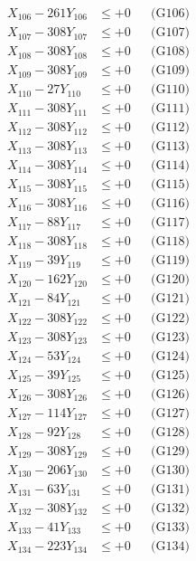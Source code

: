 \documentclass[a4paper,10pt]{article}
\begin{document}
{\begin{align}
X_{106} - 261Y_{106} &\leq +0 && \text{(G106)} \\
X_{107} - 308Y_{107} &\leq +0 && \text{(G107)} \\
X_{108} - 308Y_{108} &\leq +0 && \text{(G108)} \\
X_{109} - 308Y_{109} &\leq +0 && \text{(G109)} \\
X_{110} - 27Y_{110} &\leq +0 && \text{(G110)} \\
\allowbreak
X_{111} - 308Y_{111} &\leq +0 && \text{(G111)} \\
X_{112} - 308Y_{112} &\leq +0 && \text{(G112)} \\
X_{113} - 308Y_{113} &\leq +0 && \text{(G113)} \\
X_{114} - 308Y_{114} &\leq +0 && \text{(G114)} \\
X_{115} - 308Y_{115} &\leq +0 && \text{(G115)} \\
X_{116} - 308Y_{116} &\leq +0 && \text{(G116)} \\
X_{117} - 88Y_{117} &\leq +0 && \text{(G117)} \\
X_{118} - 308Y_{118} &\leq +0 && \text{(G118)} \\
X_{119} - 39Y_{119} &\leq +0 && \text{(G119)} \\
X_{120} - 162Y_{120} &\leq +0 && \text{(G120)} \\
\allowbreak
X_{121} - 84Y_{121} &\leq +0 && \text{(G121)} \\
X_{122} - 308Y_{122} &\leq +0 && \text{(G122)} \\
X_{123} - 308Y_{123} &\leq +0 && \text{(G123)} \\
X_{124} - 53Y_{124} &\leq +0 && \text{(G124)} \\
X_{125} - 39Y_{125} &\leq +0 && \text{(G125)} \\
X_{126} - 308Y_{126} &\leq +0 && \text{(G126)} \\
X_{127} - 114Y_{127} &\leq +0 && \text{(G127)} \\
X_{128} - 92Y_{128} &\leq +0 && \text{(G128)} \\
X_{129} - 308Y_{129} &\leq +0 && \text{(G129)} \\
X_{130} - 206Y_{130} &\leq +0 && \text{(G130)} \\
\allowbreak
X_{131} - 63Y_{131} &\leq +0 && \text{(G131)} \\
X_{132} - 308Y_{132} &\leq +0 && \text{(G132)} \\
X_{133} - 41Y_{133} &\leq +0 && \text{(G133)} \\
X_{134} - 223Y_{134} &\leq +0 && \text{(G134)} \\

\end{align}}
\end{document}
